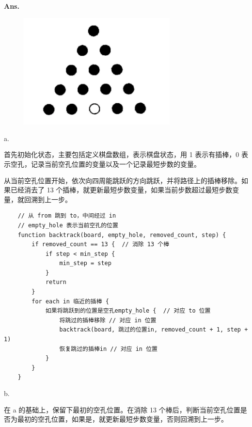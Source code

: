 \documentclass[12pt, a4paper, UTF8, fontset=windows]{ctexbook}
\newenvironment{solution}{\par\noindent\textbf{Ans.}}{\par}
\begin{document}
\begin{solution}
    \begin{figure}[h]
        \centering
        \includegraphics[width=8cm]{../../src/images/hw3-Q5.png}
    \end{figure}

    \newpage 



    a.

    首先初始化状态，主要包括定义棋盘数组，表示棋盘状态，用 1 表示有插棒，0 表示空孔，记录当前空孔位置的变量以及一个记录最短步数的变量。

    从当前空孔位置开始，依次向四周能跳跃的方向跳跃，并将路径上的插棒移除。如果已经消去了 13 个插棒，就更新最短步数变量，如果当前步数超过最短步数变量，就回溯到上一步。

    \begin{lstlisting}
    // 从 from 跳到 to，中间经过 in
    // empty_hole 表示当前空孔的位置
    function backtrack(board, empty_hole, removed_count, step) {
        if removed_count == 13 {  // 消除 13 个棒
            if step < min_step {
                min_step = step
            }
            return
        }
        for each in 临近的插棒 {
            如果将跳跃到的位置是空孔empty_hole {  // 对应 to 位置
                将跳过的插棒移除 // 对应 in 位置
                backtrack(board, 跳过的位置in, removed_count + 1, step + 1)
                恢复跳过的插棒in // 对应 in 位置
            }
        }
    }
    \end{lstlisting}

    b. 

    在 a 的基础上，保留下最初的空孔位置。在消除 13 个棒后，判断当前空孔位置是否为最初的空孔位置，如果是，就更新最短步数变量，否则回溯到上一步。


\end{solution}
\end{document}
